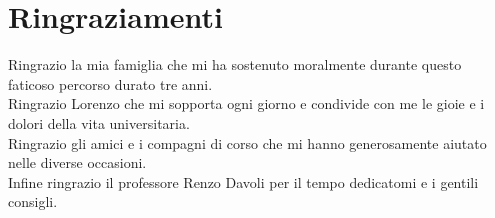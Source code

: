 \documentclass[12pt,a4paper,openright,twoside]{report}
\begin{document}
\chapter*{Ringraziamenti}
\thispagestyle{empty}
Ringrazio la mia famiglia che mi ha sostenuto moralmente durante questo faticoso percorso durato tre anni.\\
Ringrazio Lorenzo che mi sopporta ogni giorno e condivide con me le gioie e i dolori della vita universitaria.\\
Ringrazio gli amici e i compagni di corso che mi hanno generosamente aiutato nelle diverse occasioni.\\
Infine ringrazio il professore Renzo Davoli per il tempo dedicatomi e i gentili consigli.\\
\end{document}
